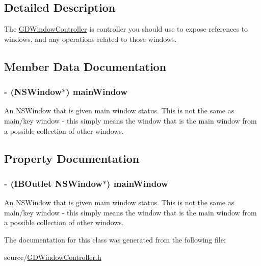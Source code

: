 \subsection{Detailed Description}
The \hyperlink{interface_g_d_window_controller}{GDWindowController} is controller you should use to expose references to windows, and any operations related to those windows. 

\subsection{Member Data Documentation}
\hypertarget{interface_g_d_window_controller_ad60a5c503821413bf4cf05e2bfa6a313}{
\subsubsection[{mainWindow}]{\setlength{\rightskip}{0pt plus 5cm}-\/ (NSWindow$\ast$) {\bf mainWindow}}}
\label{interface_g_d_window_controller_ad60a5c503821413bf4cf05e2bfa6a313}


An NSWindow that is given main window status. This is not the same as main/key window -\/ this simply means the window that is the main window from a possible collection of other windows. 

\subsection{Property Documentation}
\hypertarget{interface_g_d_window_controller_a0c459acf28211fd35be4d3b2ddbc968a}{
\subsubsection[{mainWindow}]{\setlength{\rightskip}{0pt plus 5cm}-\/ (IBOutlet NSWindow$\ast$) {\bf mainWindow}}}
\label{interface_g_d_window_controller_a0c459acf28211fd35be4d3b2ddbc968a}


An NSWindow that is given main window status. This is not the same as main/key window -\/ this simply means the window that is the main window from a possible collection of other windows. 

The documentation for this class was generated from the following file:\begin{DoxyCompactItemize}
\item 
source/\hyperlink{_g_d_window_controller_8h}{GDWindowController.h}\end{DoxyCompactItemize}
